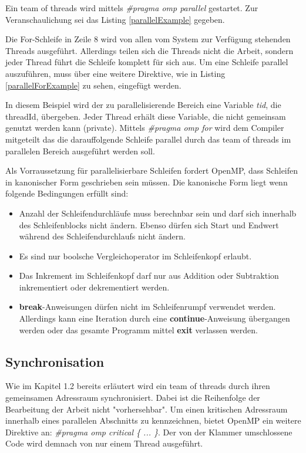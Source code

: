 \documentclass[11pt]{scrartcl}
\begin{document}
Ein team of threads wird mittels \textit{\#pragma omp parallel} gestartet. Zur Veranschaulichung sei das Listing \ref{parallelExample} gegeben. 


Die For-Schleife in Zeile 8 wird von allen vom System zur Verfügung stehenden Threads ausgeführt. Allerdings teilen sich die Threads nicht die Arbeit, sondern jeder Thread führt die Schleife komplett für sich aus. Um eine Schleife parallel auszuführen, muss über eine weitere Direktive, wie in Listing \ref{parallelForExample} zu sehen, eingefügt werden. 


In diesem Beispiel wird der zu parallelisierende Bereich eine Variable \textit{tid}, die threadId, übergeben. Jeder Thread erhält diese Variable, die nicht gemeinsam genutzt werden kann (private). Mittels \textit{\#pragma omp for} wird dem Compiler mitgeteilt das die darauffolgende Schleife parallel durch das team of threads  im parallelen Bereich ausgeführt werden soll.

Als Vorraussetzung für parallelisierbare Schleifen fordert OpenMP, dass Schleifen in kanonischer Form geschrieben sein müssen. Die kanonische Form liegt wenn folgende Bedingungen erfüllt sind: 
\begin{itemize}
\item Anzahl der Schleifendurchläufe muss berechnbar sein und darf sich innerhalb des Schleifenblocks nicht ändern. Ebenso dürfen sich Start und Endwert während des Schleifendurchlaufs nicht ändern.
\item Es sind nur boolsche Vergleichoperator im Schleifenkopf erlaubt.
\item Das Inkrement im Schleifenkopf darf nur aus Addition oder Subtraktion inkrementiert oder dekrementiert werden. 
\item \textbf{break}-Anweisungen dürfen nicht im Schleifenrumpf verwendet werden. Allerdings kann eine Iteration durch eine \textbf{continue}-Anweisung übergangen werden oder das gesamte Programm mittel \textbf{exit} verlassen werden.
\end{itemize}

\subsection{Synchronisation} 

Wie im Kapitel 1.2 bereits erläutert wird ein team of threads durch ihren gemeinsamen Adressraum synchronisiert. Dabei ist die Reihenfolge der Bearbeitung der Arbeit nicht "vorhersehbar". Um einen kritischen Adressraum innerhalb eines parallelen Abschnitts zu kennzeichnen, bietet OpenMP ein weitere Direktive an: \textit{\#pragma omp critical \{ ... \}}. Der von der Klammer umschlossene Code wird demnach von nur einem Thread ausgeführt. 
\end{document}
